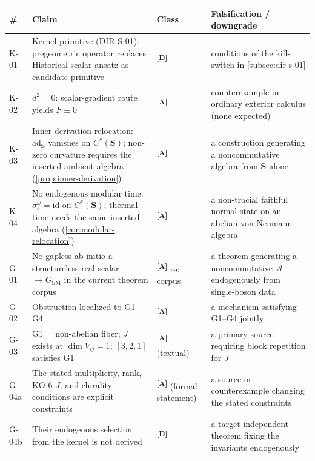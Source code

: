 \documentclass[12pt,a4paper,twoside]{article}
\theoremstyle{plain}
\theoremstyle{definition}
\theoremstyle{remark}
\newcommand{\catmark}[1]{\textsuperscript{\textsf{\textbf{[#1]}}}}
\begin{document}
\begin{table}[htbp]
\centering\scriptsize
\begin{tabular}{@{}
>{\raggedright\arraybackslash}p{}
>{\raggedright\arraybackslash}p{}
>{\raggedright\arraybackslash}p{}
>{\raggedright\arraybackslash}p{}
@{}}
\toprule
\# & Claim & Class & Falsification / downgrade \\
\midrule
K-01 & Kernel primitive (DIR-S-01): pregeometric operator replaces
Historical scalar ansatz as candidate primitive & \catmark{D} & conditions of the
kill-switch in \cref{subsec:dir-s-01} \\
K-02 & $d^2=0$: scalar-gradient route yields $F \equiv 0$ &
\catmark{A} & counterexample in ordinary exterior calculus (none
expected) \\
K-03 & Inner-derivation relocation: $\mathrm{ad}_{\mathbf S}$ vanishes on
$C^{\ast}(\mathbf S)$; non-zero curvature requires the inserted ambient
algebra (\cref{prop:inner-derivation}) & \catmark{A} & a construction
generating a noncommutative algebra from $\mathbf S$ alone \\
K-04 & No endogenous modular time: $\sigma^\omega_t=\mathrm{id}$ on
$C^{\ast}(\mathbf S)$; thermal time needs the same inserted algebra
(\cref{cor:modular-relocation}) & \catmark{A} & a non-tracial faithful normal
state on an abelian von Neumann algebra \\
G-01 & No gapless ab initio a structureless real scalar $\to G_{\mathrm{SM}}$ in the current
theorem corpus & \catmark{A} re: corpus & a theorem generating a
noncommutative $\mathcal A$ endogenously from single-boson data \\
G-02 & Obstruction localized to G1--G4 & \catmark{A} & a mechanism
satisfying G1--G4 jointly \\
G-03 & G1 = non-abelian fiber; $J$ exists at $\dim V_{ij}=1$;
$[3,2,1]$ satisfies G1 & \catmark{A} (textual) & a primary source
requiring block repetition for $J$ \\
G-04a & The stated multiplicity, rank, KO-6 $J$, and chirality conditions are explicit constraints & \catmark{A} (formal statement) & a source or counterexample changing the stated constraints \\
G-04b & Their endogenous selection from the kernel is not derived & \catmark{D} & a target-independent theorem fixing the invariants endogenously \\

\end{tabular}
\end{table}
\end{document}
